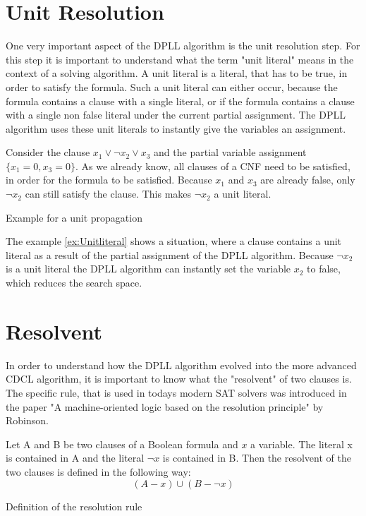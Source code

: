 \section{Unit Resolution}
One very important aspect of the DPLL algorithm is the unit resolution step. For this step it is important to understand what the term "unit literal" means in the context of a solving algorithm. A unit literal is a literal, that has to be true, in order to satisfy the formula. Such a unit literal can either occur, because the formula contains a clause with a single literal, or if the formula contains a clause with a single non false literal under the current partial assignment. The DPLL algorithm uses these unit literals to instantly give the variables an assignment. \cite{biere2009handbook}

\begin{example}
\begin{leftbar}
Consider the clause $x_1 \vee \neg x_2 \vee x_3$ and the partial variable assignment $\{x_1=0,x_3=0\}$. As we already know, all clauses of a CNF need to be satisfied, in order for the formula to be satisfied. Because $x_1$ and $x_3$ are already false, only $\neg x_2$ can still satisfy the clause. This makes $\neg x_2$ a unit literal.
\end{leftbar}
\caption{Example for a unit propagation}
\label{ex:Unitliteral}
\end{example}

The example \ref{ex:Unitliteral} shows a situation, where a clause contains a unit literal as a result of the partial assignment of the DPLL algorithm. Because $\neg x_2$ is a unit literal the DPLL algorithm can instantly set the variable $x_2$ to false, which reduces the search space.

\section{Resolvent}
In order to understand how the DPLL algorithm evolved into the more advanced CDCL algorithm, it is important to know what the "resolvent" of two clauses is. The specific rule, that is used in todays modern SAT solvers was introduced in the paper "A machine-oriented logic based on the resolution principle" \cite{robinson1965machine} by Robinson.

\begin{definition}
\begin{leftbar}
Let A and B be two clauses of a Boolean formula and $x$ a variable. The literal x is contained in A and the literal $\neg x$ is contained in B. Then the resolvent of the two clauses is defined in the following way:
\begin{displaymath}
(A - x) \cup (B - \neg x)
\end{displaymath}
\end{leftbar}
\caption{Definition of the resolution rule \cite{robinson1965machine}}
\label{def:Resolution}
\end{definition}

